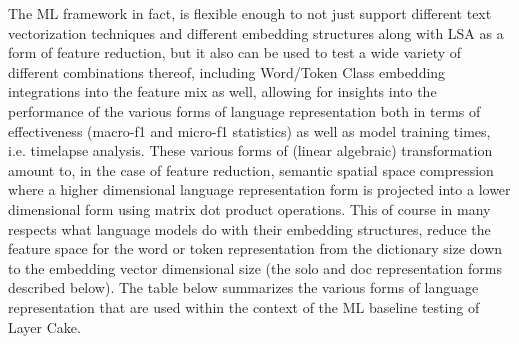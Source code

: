 \documentclass[final]{clv2025-revised}
\begin{document}
The ML framework in fact, is flexible enough to not just support different text vectorization techniques and different embedding structures along with LSA as a form of feature reduction, but it also can be used to test a wide variety of different combinations thereof, including Word/Token Class embedding integrations into the feature mix as well, allowing for insights into the performance of the various forms of language representation both in terms of effectiveness (macro-f1 and micro-f1 statistics) as well as model training times, i.e. timelapse analysis. These various forms of (linear algebraic) transformation amount to, in the case of feature reduction, semantic spatial space compression where a higher dimensional language representation form is projected into a lower dimensional form using matrix dot product operations. This of course in many respects what language models do with their embedding structures, reduce the feature space for the word or token representation from the dictionary size down to the embedding vector dimensional size (the solo and doc representation forms described below). The table below summarizes the various forms of language representation that are used within the context of the ML baseline testing of Layer Cake.
\end{document}
